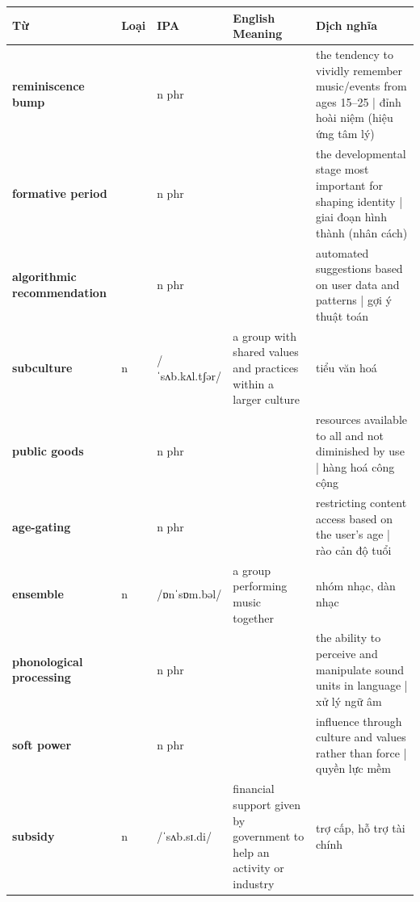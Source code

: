 \vspace{0.8em}
\begin{center}
\renewcommand{\arraystretch}{1.65}
\begin{tabularx}{\textwidth}{|V{0.22\textwidth}|C{0.07\textwidth}|I{0.20\textwidth}|Y|V{0.18\textwidth}|}
\hline
{}
\textbf{Từ} & \textbf{Loại} & \textbf{IPA} & \textbf{English Meaning} & \textbf{Dịch nghĩa} \\
\hline
\textbf{reminiscence bump} & & n phr & & the tendency to vividly remember music/events from ages 15–25 | đỉnh hoài niệm (hiệu ứng tâm lý) \\ \hline
\textbf{formative period} & & n phr & & the developmental stage most important for shaping identity | giai đoạn hình thành (nhân cách) \\ \hline
\textbf{algorithmic recommendation} & & n phr & & automated suggestions based on user data and patterns | gợi ý thuật toán \\ \hline
\textbf{subculture} & n & /ˈsʌb.kʌl.tʃər/ & a group with shared values and practices within a larger culture & tiểu văn hoá \\ \hline
\textbf{public goods} & & n phr & & resources available to all and not diminished by use | hàng hoá công cộng \\ \hline
\textbf{age-gating} & & n phr & & restricting content access based on the user's age | rào cản độ tuổi \\ \hline
\textbf{ensemble} & n & /ɒnˈsɒm.bəl/ & a group performing music together & nhóm nhạc, dàn nhạc \\ \hline
\textbf{phonological processing} & & n phr & & the ability to perceive and manipulate sound units in language | xử lý ngữ âm \\ \hline
\textbf{soft power} & & n phr & & influence through culture and values rather than force | quyền lực mềm \\ \hline
\textbf{subsidy} & n & /ˈsʌb.sɪ.di/ & financial support given by government to help an activity or industry & trợ cấp, hỗ trợ tài chính \\ \hline
\end{tabularx}
\end{center}

\newpage

